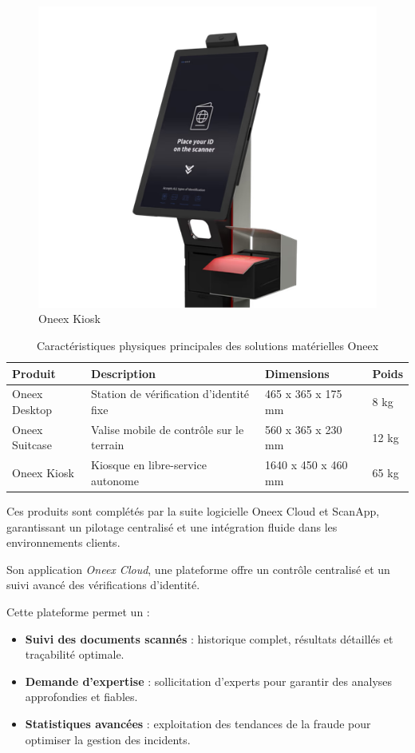 \begin{itemize}
	      \begin{figure} [H]
		      \centering
		      \includegraphics[width=.5\textwidth]{figures/Oneex kiosk.png}
		      \caption{Oneex Kiosk}
		      \label{fig:Oneex Kiosk}
	      \end{figure}
\end{itemize}

\begin{table}[H]
	\centering
	\renewcommand{\arraystretch}{1.2}
	\begin{tabular}{|p{3cm}|p{5cm}|p{4cm}|p{2.5cm}|}
		\hline
		\textbf{Produit} & \textbf{Description}                     & \textbf{Dimensions} & \textbf{Poids} \\ \hline
		Oneex Desktop    & Station de vérification d’identité fixe  & 465 x 365 x 175 mm  & 8 kg           \\ \hline
		Oneex Suitcase   & Valise mobile de contrôle sur le terrain & 560 x 365 x 230 mm  & 12 kg          \\ \hline
		Oneex Kiosk      & Kiosque en libre-service autonome        & 1640 x 450 x 460 mm & 65 kg          \\ \hline
	\end{tabular}
	\caption{Caractéristiques physiques principales des solutions matérielles Oneex}
	\label{tab:oneex-produits}
\end{table}
Ces produits sont complétés par la suite logicielle Oneex Cloud et ScanApp, garantissant un pilotage centralisé et une intégration fluide dans les environnements clients.

Son application \emph{Oneex Cloud}, une plateforme offre un contrôle centralisé et un suivi avancé des vérifications d’identité.

Cette plateforme permet un :

\begin{itemize}
	\item \textbf{Suivi des documents scannés} : historique complet, résultats détaillés et traçabilité optimale.
	\item \textbf{Demande d’expertise} : sollicitation d’experts pour garantir des analyses approfondies et fiables.
	\item \textbf{Statistiques avancées} : exploitation des tendances de la fraude pour optimiser la gestion des incidents.
\end{itemize}

